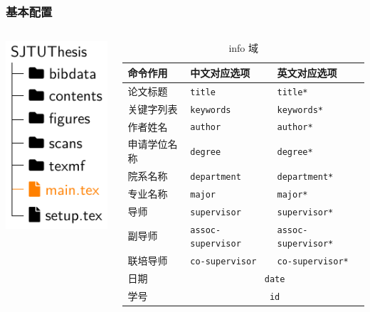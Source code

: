 \begin{frame}[label=setup]
  \frametitle{基本配置}
  \begin{columns}
    \begin{column}{0.35\textwidth}
      \includegraphics[page=4]{support/figures/thesisdir.pdf}
    \end{column}
    \begin{column}{0.65\textwidth}
      \begin{table}
        \centering
        \caption{info 域}
        \footnotesize
        \begin{tabular}{lll} \toprule
          命令作用     & 中文对应选项                      & 英文对应选项             \\ \midrule
          论文标题     & \texttt{title}                    & \texttt{title*}          \\
          关键字列表   & \texttt{keywords}                 & \texttt{keywords*}       \\
          作者姓名     & \texttt{author}                   & \texttt{author*}         \\
          申请学位名称 & \texttt{degree}                   & \texttt{degree*}         \\
          院系名称     & \texttt{department}               & \texttt{department*}     \\
          专业名称     & \texttt{major}                    & \texttt{major*}          \\
          导师         & \texttt{supervisor}               & \texttt{supervisor*}     \\
          副导师       & \texttt{assoc-supervisor}           & \texttt{assoc-supervisor*} \\
          联培导师     & \texttt{co-supervisor}              & \texttt{co-supervisor*} \\
          日期         & \multicolumn{2}{c}{\texttt{date}}                            \\
          学号         & \multicolumn{2}{c}{\texttt{id}}                              \\ \bottomrule
        \end{tabular}
      \end{table}
    \end{column}
  \end{columns}
\end{frame}

